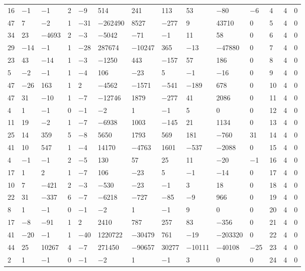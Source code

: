 \documentclass[10pt,a4paper]{amsart}
\numberwithin{equation}{section}
\theoremstyle{definition}
\numberwithin{table}{section}
\begin{document}
{\begin{paracol}{3}
\begin{supertabular}{|w{c}{.32cm}w{c}{.32cm}w{c}{.32cm}@{\hspace{.5cm}}w{c}{.2cm}w{c}{.2cm}|@{\hspace{\tabcolsep}}HHHHHHw{c}{.17cm}w{c}{.17cm}w{c}{.17cm}|}
			16 & $-$1 & $-$1 & 2 & $-$9 & 514 & 241 & 113 & 53 & $-$80 & $-$6 & 4 & 4 & 0 \\
			47 & 7 & $-$2 & 1 & $-$31 & $-$262490 & 8527 & $-$277 & 9 & 43710 & 0 & 5 & 4 & 0 \\
			34 & 23 & $-$4693 & 2 & $-$3 & $-$5042 & $-$71 & $-$1 & 11 & 58 & 0 & 6 & 4 & 0 \\
			29 & $-$14 & $-$1 & 1 & $-$28 & 287674 & $-$10247 & 365 & $-$13 & $-$47880 & 0 & 7 & 4 & 0 \\
			23 & 43 & $-$14 & 1 & $-$3 & $-$1250 & 443 & $-$157 & 57 & 186 & 0 & 8 & 4 & 0 \\
			5 & $-$2 & $-$1 & 1 & $-$4 & 106 & $-$23 & 5 & $-$1 & $-$16 & 0 & 9 & 4 & 0 \\
			47 & $-$26 & 163 & 1 & 2 & $-$4562 & $-$1571 & $-$541 & $-$189 & 678 & 0 & 10 & 4 & 0 \\
			47 & 31 & $-$10 & 1 & $-$7 & $-$12746 & 1879 & $-$277 & 41 & 2086 & 0 & 11 & 4 & 0 \\
			4 & 1 & $-$1 & 0 & $-$1 & $-$2 & 1 & $-$1 & 5 & 0 & 0 & 12 & 4 & 0 \\
			11 & 19 & $-$2 & 1 & $-$7 & $-$6938 & 1003 & $-$145 & 21 & 1134 & 0 & 13 & 4 & 0 \\
			25 & 14 & 359 & 5 & $-$8 & 5650 & 1793 & 569 & 181 & $-$760 & 31 & 14 & 4 & 0 \\
			41 & 10 & 547 & 1 & $-$4 & 14170 & $-$4763 & 1601 & $-$537 & $-$2088 & 0 & 15 & 4 & 0 \\
			4 & $-$1 & $-$1 & 2 & $-$5 & 130 & 57 & 25 & 11 & $-$20 & $-$1 & 16 & 4 & 0 \\
			17 & 1 & 2 & 1 & $-$7 & 106 & $-$23 & 5 & $-$1 & $-$14 & 0 & 17 & 4 & 0 \\
			10 & 7 & $-$421 & 2 & $-$3 & $-$530 & $-$23 & $-$1 & 3 & 18 & 0 & 18 & 4 & 0 \\
			22 & 31 & $-$337 & 6 & $-$7 & $-$6218 & $-$727 & $-$85 & $-$9 & 966 & 0 & 19 & 4 & 0 \\
			8 & 1 & $-$1 & 0 & $-$1 & $-$2 & 1 & $-$1 & 9 & 0 & 0 & 20 & 4 & 0 \\
			17 & $-$8 & $-$91 & 1 & 2 & 2410 & 787 & 257 & 83 & $-$356 & 0 & 21 & 4 & 0 \\
			41 & $-$20 & $-$1 & 1 & $-$40 & 1220722 & $-$30479 & 761 & $-$19 & $-$203320 & 0 & 22 & 4 & 0 \\
			44 & 25 & 10267 & 4 & $-$7 & 271450 & $-$90657 & 30277 & $-$10111 & $-$40108 & $-$25 & 23 & 4 & 0 \\
			2 & 1 & $-$1 & 0 & $-$1 & $-$2 & 1 & $-$1 & 3 & 0 & 0 & 24 & 4 & 0 \\

\end{supertabular}
\end{paracol}}
\end{document}
